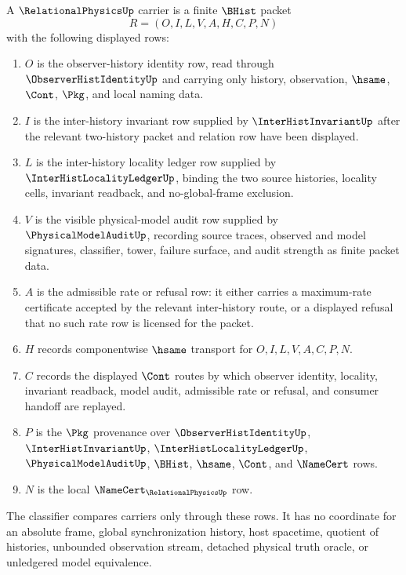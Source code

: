 \begin{definition}
\label{def:relational-physics-carrier}
A $\RelationalPhysicsUp$ carrier is a finite $\BHist$ packet
$$
R=(O,I,L,V,A,H,C,P,N)
$$
with the following displayed rows:
\begin{enumerate}
\item $O$ is the observer-history identity row, read through $\ObserverHistIdentityUp$ and carrying only history, observation, $\hsame$, $\Cont$, $\Pkg$, and local naming data.
\item $I$ is the inter-history invariant row supplied by $\InterHistInvariantUp$ after the relevant two-history packet and relation row have been displayed.
\item $L$ is the inter-history locality ledger row supplied by $\InterHistLocalityLedgerUp$, binding the two source histories, locality cells, invariant readback, and no-global-frame exclusion.
\item $V$ is the visible physical-model audit row supplied by $\PhysicalModelAuditUp$, recording source traces, observed and model signatures, classifier, tower, failure surface, and audit strength as finite packet data.
\item $A$ is the admissible rate or refusal row: it either carries a maximum-rate certificate accepted by the relevant inter-history route, or a displayed refusal that no such rate row is licensed for the packet.
\item $H$ records componentwise $\hsame$ transport for $O,I,L,V,A,C,P,N$.
\item $C$ records the displayed $\Cont$ routes by which observer identity, locality, invariant readback, model audit, admissible rate or refusal, and consumer handoff are replayed.
\item $P$ is the $\Pkg$ provenance over $\ObserverHistIdentityUp$, $\InterHistInvariantUp$, $\InterHistLocalityLedgerUp$, $\PhysicalModelAuditUp$, $\BHist$, $\hsame$, $\Cont$, and $\NameCert$ rows.
\item $N$ is the local $\NameCert_{\RelationalPhysicsUp}$ row.
\end{enumerate}
The classifier compares carriers only through these rows. It has no coordinate for an absolute frame, global synchronization history, host spacetime, quotient of histories, unbounded observation stream, detached physical truth oracle, or unledgered model equivalence.
\end{definition}

